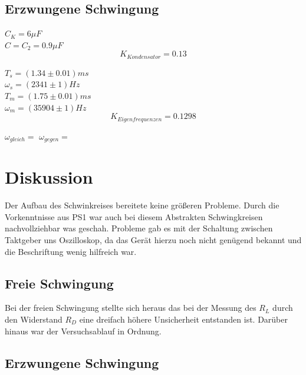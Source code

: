 \documentclass[12pt,a4paper]{article}
\begin{document}
\begin{multicols}{2}

\subsection{Erzwungene Schwingung}


$C_K = 6 \mu F$\\
$C = C_2 = 0.9 \mu F$\\
$$K_{Kondensator} = 0.13 $$

\noindent
$T_s = (1.34 \pm 0.01)ms$\\
$\omega_s = (2341 \pm 1) Hz$\\
$T_m = (1.75 \pm 0.01)ms$\\
$\omega_m = (35904 \pm 1) Hz$\\

$$K_{Eigenfrequenzen} = 0.1298$$

\noindent
$\omega_{gleich} = $
$\omega_{gegen} = $

\pagebreak
\section{Diskussion}

Der Aufbau des Schwinkreises bereitete keine größeren Probleme. Durch die Vorkenntnisse aus PS1 war auch bei diesem Abstrakten Schwingkreisen nachvollziehbar was geschah. Probleme gab es mit der Schaltung zwischen Taktgeber uns Oszilloskop, da das Gerät hierzu noch nicht genügend bekannt und die Beschriftung wenig hilfreich war.

\subsection{Freie Schwingung}
Bei der freien Schwingung stellte sich heraus das bei der Messung des $R_L$ durch den Widerstand $R_D$ eine dreifach höhere Unsicherheit entstanden ist. Darüber hinaus war der Versuchsablauf in Ordnung. 

\subsection{Erzwungene Schwingung}

\end{multicols}
\end{document}
